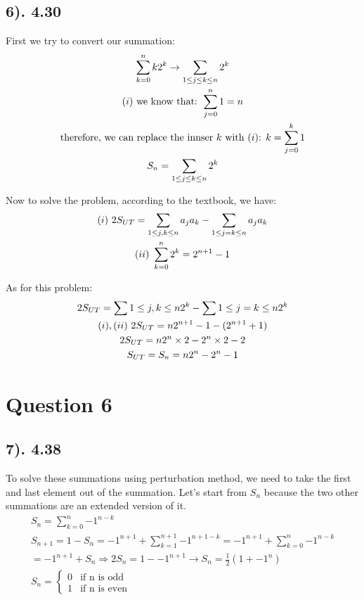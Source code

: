 \documentclass[12pt]{article}
\newcommand{\RNum}[1]{\uppercase\expandafter{\romannumeral #1\relax}}
\begin{document}
\subsection*{6). 4.30}
First we try to convert our summation:
\begin{gather*}
    \sum_{k=0}^n k2^k \to \sum_{1 \leq j \leq k \leq n } 2^k \\
    \text{($\RNum{1}$) we know that: } \sum_{j=0}^n 1 = n \\
    \text{therefore, we can replace the innser $k$ with ($\RNum{1}$): } k = \sum_{j=0}^k 1 \\
    S_{n} = \sum_{1 \leq j \leq k \leq n} 2^k
\end{gather*}

Now to solve the problem, according to the textbook, we have:
\begin{gather*}
    \text{$(\RNum{1})$ } 2S_{UT} = \sum_{1 \leq j,k \leq n} a_{j}a_{k} - \sum_{1 \leq j=k \leq n} a_{j}a_{k} \\
    \text{$(\RNum{2})$ } \sum_{k=0}^n 2^k = 2^{n+1} - 1
\end{gather*}

As for this problem:
\begin{gather*}
    2S_{UT} = \sum{1 \leq j,k \leq n} 2^k - \sum{1 \leq j=k \leq n} 2^k \\
    \text{$(\RNum{1}), (\RNum{2})$ } 2S_{UT} = n2^{n+1} - 1 - (2^{n+1} + 1) \\
    2S_{UT} = n2^{n} \times 2 - 2^n \times 2 - 2 \\
    S_{UT} = S_{n} = n2^{n} - 2^n - 1 
\end{gather*}

\section*{Question 6}
\subsection*{7). 4.38}
To solve these summations using perturbation method, we need to take the first and last element out of the summation. Let's start from
$S_{n}$ because the two other summations are an extended version of it.
\begin{gather*}
    S_{n} = \sum_{k=0}^n {-1}^{n-k} \\
    S_{n+1} = 1 - S_{n} = {-1}^{n+1} + \sum_{k=1}^{n+1} {-1}^{n+1-k} = {-1}^{n+1} + \sum_{k=0}^n {-1}^{n-k} \\
    = {-1}^{n+1} + S_{n} \Rightarrow 2S_{n} = 1 - {-1}^{n+1} \to S_{n} = \frac{1}{2} (1 + {-1}^n) \\
    S_{n} = \begin{cases} 0 & \text{if n is odd} \\ 1 & \text{if n is even} \end{cases}
\end{gather*}
\end{document}
